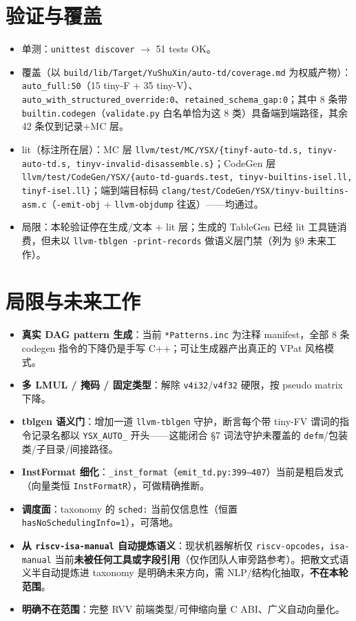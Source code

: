 \documentclass[11pt,UTF8,fontset=none]{ctexart}
\begin{document}
\section{验证与覆盖}
\begin{itemize}[leftmargin=1.4em,itemsep=2pt]
\item 单测：\texttt{unittest discover} $\to$ 51 tests OK。
\item 覆盖（以 \texttt{build/lib/Target/YuShuXin/auto-td/coverage.md} 为权威产物）：\texttt{auto\_full:50}（15 tiny-F + 35 tiny-V）、\texttt{auto\_with\_structured\_override:0}、\texttt{retained\_schema\_gap:0}；其中 8 条带 \texttt{builtin.codegen}（\texttt{validate.py} 白名单恰为这 8 类）具备端到端路径，其余 42 条仅到记录+MC 层。
\item lit（标注所在层）：MC 层 \texttt{llvm/test/MC/YSX/\{tinyf-auto-td.s, tinyv-auto-td.s, tinyv-invalid-disassemble.s\}}；CodeGen 层 \texttt{llvm/test/CodeGen/YSX/\{auto-td-guards.test, tinyv-builtins-isel.ll, tinyf-isel.ll\}}；端到端目标码 \texttt{clang/test/CodeGen/YSX/tinyv-builtins-asm.c}（\texttt{-emit-obj} + \texttt{llvm-objdump} 往返）——均通过。
\item 局限：本轮验证停在生成/文本 + lit 层；生成的 TableGen 已经 lit 工具链消费，但未以 \texttt{llvm-tblgen -print-records} 做语义层门禁（列为 §9 未来工作）。
\end{itemize}

\section{局限与未来工作}
\begin{itemize}[leftmargin=1.4em,itemsep=2pt]
\item \textbf{真实 DAG pattern 生成}：当前 \texttt{*Patterns.inc} 为注释 manifest，全部 8 条 codegen 指令的下降仍是手写 C++；可让生成器产出真正的 VPat 风格模式。
\item \textbf{多 LMUL / 掩码 / 固定类型}：解除 \texttt{v4i32}/\texttt{v4f32} 硬限，按 pseudo matrix 下降。
\item \textbf{tblgen 语义门}：增加一道 \texttt{llvm-tblgen} 守护，断言每个带 tiny-FV 谓词的指令记录名都以 \texttt{YSX\_AUTO\_} 开头——这能闭合 §7 词法守护未覆盖的 \texttt{defm}/包装类/子目录/间接路径。
\item \textbf{InstFormat 细化}：\texttt{\_inst\_format}（\texttt{emit\_td.py:399--407}）当前是粗启发式（向量类恒 \texttt{InstFormatR}），可做精确推断。
\item \textbf{调度面}：taxonomy 的 \texttt{sched:} 当前仅信息性（恒置 \texttt{hasNoSchedulingInfo=1}），可落地。
\item \textbf{从 \texttt{riscv-isa-manual} 自动提炼语义}：现状机器解析仅 \texttt{riscv-opcodes}，\texttt{isa-manual} 当前\textbf{未被任何工具或字段引用}（仅作团队人审旁路参考）。把散文式语义半自动提炼进 taxonomy 是明确未来方向，需 NLP/结构化抽取，\textbf{不在本轮范围}。
\item \textbf{明确不在范围}：完整 RVV 前端类型/可伸缩向量 C ABI、广义自动向量化。
\end{itemize}
\end{document}
